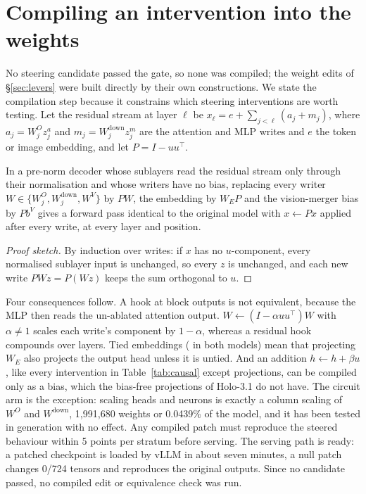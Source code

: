 \section{Compiling an intervention into the weights}
\label{sec:compile}
No steering candidate passed the gate, so none was compiled; the weight edits of \S\ref{sec:levers} were built directly by their own constructions. We state the compilation step because it constrains which steering interventions are worth testing. Let the residual stream at layer $\ell$ be $x_\ell = e + \sum_{j<\ell}(a_j + m_j)$, where $a_j=W^O_j z^a_j$ and $m_j=W^{\text{down}}_j z^m_j$ are the attention and MLP writes and $e$ the token or image embedding, and let $P=I-uu^\top$.

\begin{proposition}\label{prop:equiv}
In a pre-norm decoder whose sublayers read the residual stream only through their normalisation and whose writers have no bias, replacing every writer $W\in\{W^O_j, W^{\text{down}}_j, W^V\}$ by $PW$, the embedding by $W_EP$ and the vision-merger bias by $Pb^V$ gives a forward pass identical to the original model with $x\leftarrow Px$ applied after every write, at every layer and position.
\end{proposition}
\begin{proof}[Proof sketch]
By induction over writes: if $x$ has no $u$-component, every normalised sublayer input is unchanged, so every $z$ is unchanged, and each new write $PWz=P(Wz)$ keeps the sum orthogonal to $u$.
\end{proof}
Four consequences follow. A hook at block outputs is not equivalent, because the MLP then reads the un-ablated attention output. $W\leftarrow(I-\alpha uu^\top)W$ with $\alpha\neq1$ scales each write's component by $1-\alpha$, whereas a residual hook compounds over layers. Tied embeddings (\cfgBigTied{} in both models) mean that projecting $W_E$ also projects the output head unless it is untied. And an addition $h\leftarrow h+\beta u$, like every intervention in Table~\ref{tab:causal} except projections, can be compiled only as a bias, which the bias-free projections of Holo-3.1 do not have. The circuit arm is the exception: scaling heads and neurons is exactly a column scaling of $W^O$ and $W^{\text{down}}$, 1{,}991{,}680 weights or 0.0439\% of the model, and it has been tested in generation with no effect. %
Any compiled patch must reproduce the steered behaviour within 5 points per stratum before serving. The serving path is ready: a patched checkpoint is loaded by vLLM in about seven minutes, a null patch changes 0/724 tensors and reproduces the original outputs. %
Since no candidate passed, no compiled edit or equivalence check was run.
\FloatBarrier
